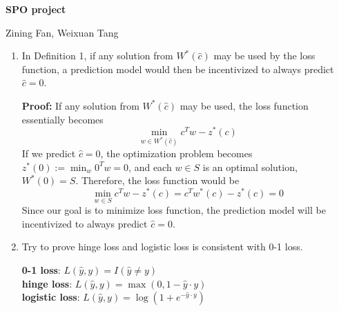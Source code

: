 \documentclass[11pt]{article}
\begin{document}
\begin{flushright}
{\bf SPO project}
\end{flushright}
\begin{flushleft}
Zining Fan, Weixuan Tang\\
\end{flushleft}


\begin{enumerate}
    \item In Definition 1, if any solution from $W^*(\hat{c})$ may be used by the loss function, a prediction model would then be incentivized to always predict $\hat{c}=0$.
    
    \textbf{Proof:} If any solution from $W^*(\hat{c})$ may be used, the loss function essentially becomes 
    \begin{equation}
        \min _{w \in W^{*}(\hat{c})} c^{T} w-z^{*}(c)
    \end{equation}
    If we predict $\hat{c} = 0$, the optimization problem becomes $z^{*}(0):=\min _{w} 0^{T} w = 0$, and each $w \in S$ is an optimal solution, $W^{*}(0)=S$. Therefore, the loss function would be
    \begin{equation}
        \min _{w \in S} c^{T} w-z^{*}(c) = c^{T} w^{*}(c)-z^{*}(c) = 0
    \end{equation}
    Since our goal is to minimize loss function, the prediction model will be incentivized to always predict $\hat{c}=0$.
    
    
    \item Try to prove hinge loss and logistic loss is consistent with 0-1 loss.
    
    \textbf{0-1 loss}: $L(\hat{y}, y)=I(\hat{y} \neq y)$
    \\\textbf{hinge loss}: $L(\hat{y}, y)=\max (0,1-\hat{y}\cdot y)$
    \\\textbf{logistic loss}: $L(\hat{y}, y)= \log \left(1+e^{-\hat{y}\cdot y}\right)$
    

\end{enumerate}
\end{document}

